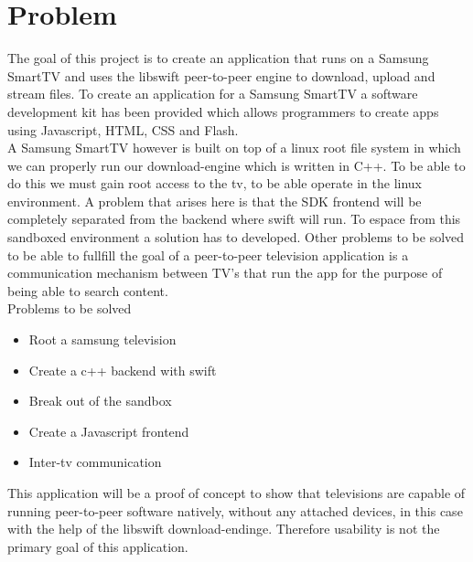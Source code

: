 \chapter{Problem}

The goal of this project is to create an application that runs on a Samsung SmartTV and uses the libswift peer-to-peer engine to download, upload and stream files. To create an application for a Samsung SmartTV a software development kit has been provided which allows programmers to create apps using Javascript, HTML, CSS and Flash.\\
A Samsung SmartTV however is built on top of a linux root file system in which we can properly run our download-engine which is written in C++. To be able to do this we must gain root access to the tv, to be able operate in the linux environment. A problem that arises here is that the SDK frontend will be completely separated from the backend where swift will run. To espace from this sandboxed environment a solution has to developed. Other problems to be solved to be able to fullfill the goal of a peer-to-peer television application is a communication mechanism between TV's that run the app for the purpose of being able to search content.\\

Problems to be solved
\begin{itemize}
\item Root a samsung television
\item Create a c++ backend with swift
\item Break out of the sandbox
\item Create a Javascript frontend
\item Inter-tv communication
\end{itemize}

This application will be a proof of concept to show that televisions are capable of running peer-to-peer software natively, without any attached devices, in this case with the help of the libswift download-endinge. Therefore usability is not the primary goal of this application.

